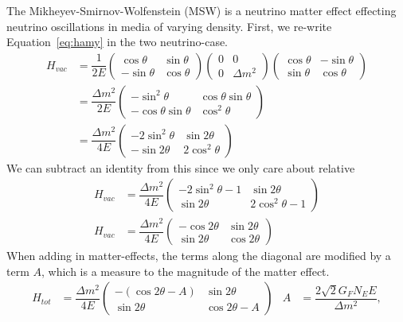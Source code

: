 \documentclass[main.tex]{subfiles}
\begin{document}
The Mikheyev-Smirnov-Wolfenstein (MSW) is a neutrino matter effect effecting neutrino oscillations in media of varying density. 
First, we re-write Equation~\eqref{eq:hamy} in the two neutrino-case. 
\begin{align}
    H_{vac} &= \dfrac{1}{2E}\left(\begin{array}{cc}\cos\theta &\sin\theta \\ -\sin\theta & \cos\theta\end{array}\right)\left(\begin{array}{cc}0 & 0 \\ 0 & \Delta m^{2}\end{array}\right) \left(\begin{array}{cc}\cos\theta &-\sin\theta \\ \sin\theta & \cos\theta\end{array}\right) \\
    &= \dfrac{\Delta m^{2}}{2E}\left(\begin{array}{cc} -\sin^{2}\theta & \cos\theta\sin\theta \\ -\cos\theta \sin\theta & \cos^{2}\theta\end{array}\right)\\
    &= \dfrac{\Delta m^{2}}{4E}\left(\begin{array}{cc} -2\sin^{2}\theta & \sin 2\theta \\ -\sin 2\theta & 2\cos^{2}\theta\end{array}\right)
\end{align}
We can subtract an identity from this since we only care about relative 
\begin{align}
    H_{vac}  &= \dfrac{\Delta m^{2}}{4E}\left(\begin{array}{cc} -2\sin^{2}\theta-1 & \sin 2\theta \\ \sin 2\theta & 2\cos^{2}\theta -1\end{array}\right)\\
    H_{vac} &= \dfrac{\Delta m^{2}}{4E}\left(\begin{array}{cc} -\cos 2\theta & \sin 2\theta \\ \sin 2\theta & \cos 2\theta \end{array}\right)
\end{align}
When adding in matter-effects, the terms along the diagonal are modified by a term $A$, which is a measure to the magnitude of the matter effect.
\begin{align}\label{eq:hamil_msq}
    H_{tot} &= \dfrac{\Delta m^{2}}{4E}\left(\begin{array}{cc} -(\cos 2\theta - A) & \sin 2\theta \\ \sin 2\theta & \cos 2\theta - A\end{array}\right) & A&= \dfrac{2\sqrt{2} G_{F} N_{E}E}{\Delta m^{2}},
\end{align}
\end{document}
